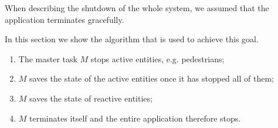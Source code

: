 When describing the shutdown of the whole system, we assumed that the
application terminates gracefully.

In this section we show the algorithm that is used to achieve this goal.

\begin{enumerate}
  \item The master task $M$ stops active entities, e.g. pedestrians;
  \item $M$ saves the state of the active entities once it has stopped all of
    them;
  \item $M$ saves the state of reactive entities;
  \item $M$ terminates itself and the entire application therefore stops.
\end{enumerate}
